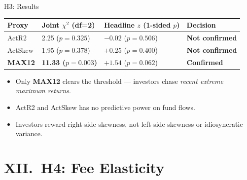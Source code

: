 \documentclass[10pt, aspectratio=169]{beamer}
\newcommand{\yes}{\textcolor{successgreen}{\textbf{Confirmed}}}
\newcommand{\no}{\textcolor{alertred}{\textbf{Not confirmed}}}
\begin{document}
\begin{frame}{H3: Results}
  \scriptsize
  \begin{tabular}{lp{3.8cm}p{3.2cm}p{1.8cm}}
    \toprule
    Proxy & Joint $\chi^2$ (df=2) & Headline $z$ (1-sided $p$) & Decision \\
    \midrule
    ActR2            & 2.25 ($p=0.325$)           & $-0.02$ ($p=0.506$)         & \no \\
    ActSkew          & 1.95 ($p=0.378$)           & $+0.25$ ($p=0.400$)         & \no \\
    \textbf{MAX12}   & \textbf{11.33 ($p=0.003$)} & $\mathbf{+1.54}$ ($p=0.062$) & \textbf{\yes} \\
    \bottomrule
  \end{tabular}
  \normalsize
  \vspace{5pt}
  \begin{itemize}\itemsep3pt
    \item Only \textbf{MAX12} clears the threshold — investors chase \emph{recent extreme maximum returns}.
    \item ActR2 and ActSkew has no predictive power on fund flows. 
    \item Investors reward right-side skewness, not left-side skewness or idiosyncratic variance.
  \end{itemize}
\end{frame}

\section{XII.\ H4: Fee Elasticity}
\end{document}
